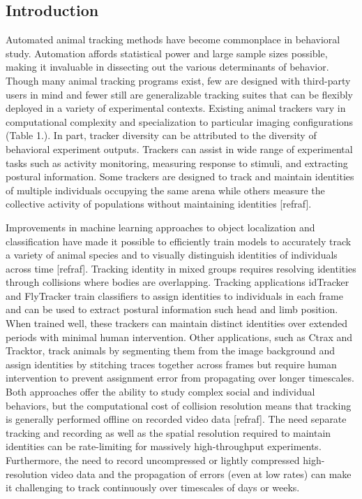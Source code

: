 \documentclass[10pt]{article}
\begin{document}
\vspace{1cm}
\begin{multicols}{2}
\section*{Introduction}

Automated animal tracking methods have become commonplace in behavioral study. Automation affords statistical power and large sample sizes possible, making it invaluable in dissecting out the various determinants of behavior. Though many animal tracking programs exist, few are designed with third-party users in mind and fewer still are generalizable tracking suites that can be flexibly deployed in a variety of experimental contexts. Existing animal trackers vary in computational complexity and specialization to particular imaging configurations (Table 1.). In part, tracker diversity can be attributed to the diversity of behavioral experiment outputs. Trackers can assist in wide range of experimental tasks such as activity monitoring, measuring response to stimuli, and extracting postural information. Some trackers are designed to track and maintain identities of multiple individuals occupying the same arena while others measure the collective activity of populations without maintaining identities [refraf]. 

Improvements in machine learning approaches to object localization and classification have made it possible to efficiently train models to accurately track a variety of animal species and to visually distinguish identities of individuals across time [refraf]. Tracking identity in mixed groups requires resolving identities through collisions where bodies are overlapping. Tracking applications idTracker and FlyTracker train classifiers to assign identities to individuals in each frame and can be used to extract postural information such head and limb position. When trained well, these trackers can maintain distinct identities over extended periods with minimal human intervention. Other applications, such as Ctrax and Tracktor, track animals by segmenting them from the image background and assign identities by stitching traces together across frames but require human intervention to prevent assignment error from propagating over longer timescales. Both approaches offer the ability to study complex social and individual behaviors, but the computational cost of collision resolution means that tracking is generally performed offline on recorded video data [refraf]. The need separate tracking and recording as well as the spatial resolution required to maintain identities can be rate-limiting for massively high-throughput experiments. Furthermore, the need to record uncompressed or lightly compressed high-resolution video data and the propagation of errors (even at low rates) can make it challenging to track continuously over timescales of days or weeks.


\end{multicols}
\end{document}
